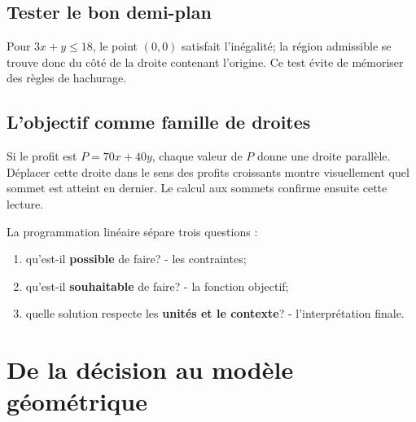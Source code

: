 \documentclass[12pt,a4paper,openany]{book}
\begin{document}
\subsection{Tester le bon demi-plan}
Pour $3x+y\le18$, le point $(0,0)$ satisfait l'inégalité; la région admissible se trouve donc du côté de la droite contenant l'origine. Ce test évite de mémoriser des règles de hachurage.

\begin{center}
\end{center}

\subsection{L'objectif comme famille de droites}
Si le profit est $P=70x+40y$, chaque valeur de $P$ donne une droite parallèle. Déplacer cette droite dans le sens des profits croissants montre visuellement quel sommet est atteint en dernier. Le calcul aux sommets confirme ensuite cette lecture.

\begin{connectionbox}
La programmation linéaire sépare trois questions :
\begin{enumerate}
\item qu'est-il \textbf{possible} de faire? - les contraintes;
\item qu'est-il \textbf{souhaitable} de faire? - la fonction objectif;
\item quelle solution respecte les \textbf{unités et le contexte}? - l'interprétation finale.
\end{enumerate}
\end{connectionbox}


\section{De la décision au modèle géométrique}
\end{document}
